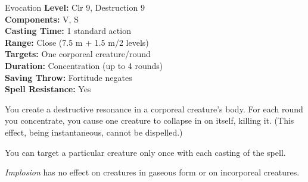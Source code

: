 {Evocation}
{
	\textbf{Level:}
	Clr 9, Destruction 9\\
	\textbf{Components:}
	V, S\\
	\textbf{Casting Time:}
	1 standard action\\
	\textbf{Range:}
	Close (7.5 m + 1.5 m/2 levels)\\
	\textbf{Targets:}
	One corporeal creature/round\\
	\textbf{Duration:}
	Concentration (up to 4 rounds)\\
	\textbf{Saving Throw:}
	Fortitude negates\\
	\textbf{Spell Resistance:}
	Yes\\
}
{
	You create a destructive resonance in a corporeal creature's body. For each round you concentrate, you cause one creature to collapse in on itself, killing it. (This effect, being instantaneous, cannot be dispelled.)

	You can target a particular creature only once with each casting of the spell.

	\emph{Implosion} has no effect on creatures in gaseous form or on incorporeal creatures.

}
